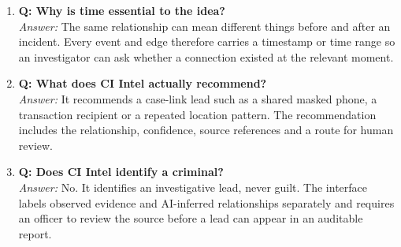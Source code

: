 \documentclass[10pt,a4paper]{article}
\newcommand{\qa}[2]{\item \textbf{\color{navy}Q: #1}\\[-1pt]{\color{coral}\textit{Answer:}} #2}
\begin{document}
\begin{enumerate}
\qa{Why is time essential to the idea?}{The same relationship can mean different things before and after an incident. Every event and edge therefore carries a timestamp or time range so an investigator can ask whether a connection existed at the relevant moment.}
\qa{What does CI Intel actually recommend?}{It recommends a case-link lead such as a shared masked phone, a transaction recipient or a repeated location pattern. The recommendation includes the relationship, confidence, source references and a route for human review.}
\qa{Does CI Intel identify a criminal?}{No. It identifies an investigative lead, never guilt. The interface labels observed evidence and AI-inferred relationships separately and requires an officer to review the source before a lead can appear in an auditable report.}
\end{enumerate}
\end{document}

